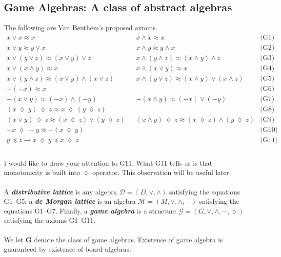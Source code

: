 \documentclass[12pt]{article}
\begin{document}
\subsection{Game Algebras: A class of abstract algebras}
\noindent The following are Van Benthem's proposed axioms. 
\[
\begin{array}{llcl}
x \lor x \approx x & & x \land x \approx x & \text{(G1)} \\[4pt]
x \lor y \approx y \lor x & & x \land y \approx y \land x & \text{(G2)} \\[4pt]
x \lor (y \lor z) \approx (x \lor y) \lor z & & x \land (y \land z) \approx (x \land y) \land z & \text{(G3)} \\[4pt]
x \lor (x \land y) \approx x & & x \land (x \lor y) \approx x & \text{(G4)} \\[4pt]
x \lor (y \land z) \approx (x \lor y) \land (x \lor z) & & x \land (y \lor z) \approx (x \land y) \lor (x \land z) & \text{(G5)} \\[4pt]
-(-x) \approx x & & & \text{(G6)} \\[4pt]
-(x \lor y) \approx (-x) \land (-y) & & -(x \land y) \approx (-x) \lor (-y) & \text{(G7)} \\[4pt]
(x \; \lozenge \; y)\; \lozenge \; z \approx x \; \lozenge \; (y \; \lozenge \; z) & & & \text{(G8)} \\[4pt]
(x \lor y)\; \lozenge \; z \approx (x \; \lozenge \; z) \lor (y \; \lozenge \; z) & & (x \land y)\; \lozenge \; z \approx (x \; \lozenge \; z) \land (y \; \lozenge \; z) & \text{(G9)} \\[4pt]
 -x \; \lozenge \; -y \approx -(x \; \lozenge \; y) & & & \text{(G10)} \\[4pt]
 y \preceq z \rightarrow x \; \lozenge \; y \preceq x \; \lozenge \; z & & & \text{(G11)} \\
 \end{array}
\]
\\
I would like to draw your attention to G11. What G11 tells us is that monotonicity is built into $\lozenge$ operator. This observation will be useful later. \\ \\
A \textbf{\emph{distributive lattice}} is any algebra 
$\mathcal{D} = (D, \lor, \land)$ satisfying the equations G1--G5;  
a \textbf{\emph{de Morgan lattice}} is an algebra 
$\mathcal{M} = (M, \lor, \land, -)$ satisfying the equations G1--G7.  
Finally, a \textbf{\emph{game algebra}} is a structure 
$\mathcal{G} = (G, \lor, \land, -, \lozenge)$ satisfying the axioms G1--G11. \\ \\ 
We let $\mathbf{G}$ denote the class of game algebras. Existence of game algebra is guaranteed by existence of board algebras.
\end{document}
